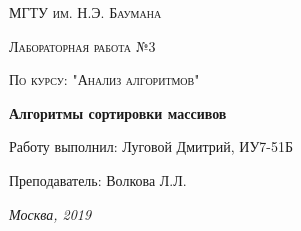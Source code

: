 \documentclass[a4paper,12pt]{report}
\begin{document}
\begin{titlepage}
	\centering
	{\scshape\LARGE МГТУ им. Н.Э. Баумана \par}
	\vspace{4cm}
	{\scshape\Large Лабораторная работа №3\par}
	\vspace{0.5cm}	
	{\scshape\Large По курсу: "Анализ алгоритмов"\par}
	\vspace{2cm}
	{\huge\bfseries Алгоритмы сортировки массивов\par}
	\vspace{3cm}
	\Large Работу выполнил: Луговой Дмитрий, ИУ7-51Б\par
	\vspace{0.5cm}
	\Large Преподаватель:  Волкова Л.Л.\par

	\vfill
	\large \textit {Москва, 2019} \par
\end{titlepage}

\setcounter{page}{2}

\tableofcontents

\newpage
\end{document}

